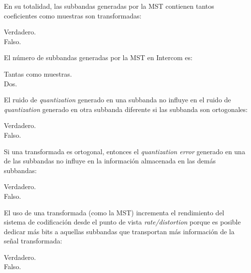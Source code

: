 \documentclass[legalpaper, 12pt, addpoints]{exam}
\begin{document}
\begin{questions}
\vspace{0.10in}

\question En su totalidad, las subbandas generadas por la MST
contienen tantos coeficientes como muestras son transformadas:

\begin{oneparchoices}
  \choice Verdadero.\\
  \choice Falso.
\end{oneparchoices}
  
\vspace{0.10in}

\question El número de subbandas generadas por la MST en Intercom es:

\begin{oneparchoices}
  \choice Tantas como muestras.\\
  \choice Dos.
\end{oneparchoices}
  
\vspace{0.10in}

\question El ruido de \emph{quantization} generado en una subbanda no
influye en el ruido de \emph{quantization} generado en otra subbanda
diferente si las subbanda son ortogonales:

\begin{oneparchoices}
  \choice Verdadero.\\
  \choice Falso.
\end{oneparchoices}
  
\vspace{0.10in}

\question Si una transformada es ortogonal, entonces el
\emph{quantization error} generado en una de las subbandas no influye
en la información almacenada en las demás subbandas:

\begin{oneparchoices}
  \choice Verdadero.\\
  \choice Falso.
\end{oneparchoices}
  
\vspace{0.10in}

\question El uso de una transformada (como la MST) incrementa el
rendimiento del sistema de codificación desde el punto de vista
\emph{rate/distortion} porque es posible dedicar más bits a aquellas
subbandas que transportan más información de la señal transformada:

\begin{oneparchoices}
  \choice Verdadero.\\
  \choice Falso.
\end{oneparchoices}
  

\end{questions}
\end{document}
